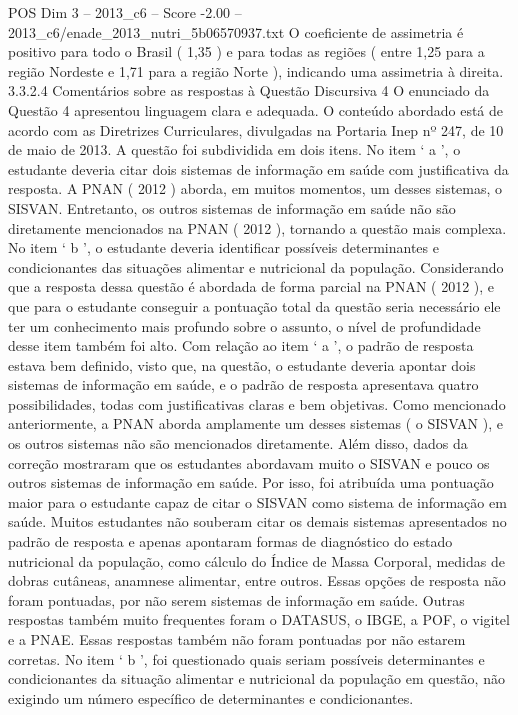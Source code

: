 \begin{textsample}{POS Dim 3 – 2013\_c6 – Score -2.00 – 2013\_c6/enade\_2013\_nutri\_5b06570937.txt}
O coeficiente de assimetria é positivo para todo o Brasil ( 1,35 ) e para todas as regiões ( entre 1,25 para a região Nordeste e 1,71 para a região Norte ), indicando uma assimetria à direita. 3.3.2.4 Comentários sobre as respostas à Questão Discursiva 4 O enunciado da Questão 4 apresentou linguagem clara e adequada.
O conteúdo abordado está de acordo com as Diretrizes Curriculares, divulgadas na Portaria Inep nº 247, de 10 de maio de 2013.
A questão foi subdividida em dois itens.
No item ‘ a ’, o estudante deveria citar dois sistemas de informação em saúde com justificativa da resposta.
A PNAN ( 2012 ) aborda, em muitos momentos, um desses sistemas, o SISVAN.
Entretanto, os outros sistemas de informação em saúde não são diretamente mencionados na PNAN ( 2012 ), tornando a questão mais complexa.
No item ‘ b ’, o estudante deveria identificar possíveis determinantes e condicionantes das situações alimentar e nutricional da população.
Considerando que a resposta dessa questão é abordada de forma parcial na PNAN ( 2012 ), e que para o estudante conseguir a pontuação total da questão seria necessário ele ter um conhecimento mais profundo sobre o assunto, o nível de profundidade desse item também foi alto.
Com relação ao item ‘ a ’, o padrão de resposta estava bem definido, visto que, na questão, o estudante deveria apontar dois sistemas de informação em saúde, e o padrão de resposta apresentava quatro possibilidades, todas com justificativas claras e bem objetivas.
Como mencionado anteriormente, a PNAN aborda amplamente um desses sistemas ( o SISVAN ), e os outros sistemas não são mencionados diretamente.
Além disso, dados da correção mostraram que os estudantes abordavam muito o SISVAN e pouco os outros sistemas de informação em saúde.
Por isso, foi atribuída uma pontuação maior para o estudante capaz de citar o SISVAN como sistema de informação em saúde.
Muitos estudantes não souberam citar os demais sistemas apresentados no padrão de resposta e apenas apontaram formas de diagnóstico do estado nutricional da população, como cálculo do Índice de Massa Corporal, medidas de dobras cutâneas, anamnese alimentar, entre outros.
Essas opções de resposta não foram pontuadas, por não serem sistemas de informação em saúde.
Outras respostas também muito frequentes foram o DATASUS, o IBGE, a POF, o vigitel e a PNAE.
Essas respostas também não foram pontuadas por não estarem corretas.
No item ‘ b ’, foi questionado quais seriam possíveis determinantes e condicionantes da situação alimentar e nutricional da população em questão, não exigindo um número específico de determinantes e condicionantes.

\end{textsample}
